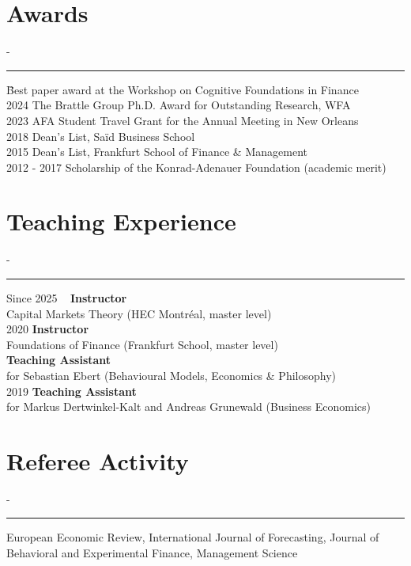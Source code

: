 \documentclass{res}
\newcommand{\sectionline}{	\vspace{-8pt}
	{\parindent-\sectionwidth \rule{\resumewidth}{0.4pt}} }
\newenvironment{nstabbing}
  {\setlength{\topsep}{-\parskip}%
   \setlength{\partopsep}{0pt}%
   \tabbing}
  {\endtabbing}
\begin{document}
\begin{resume}
\section{Awards} 	
	\sectionline
	\vspace{-3ex}
    \begin{nstabbing}
    2025 \qquad \qquad \qquad \= Best paper award at the Workshop on Cognitive Foundations in Finance \\[0.5ex]
    2024 \> The Brattle Group Ph.D. Award for Outstanding Research, WFA \\[0.5ex]
    2023 \> AFA Student Travel Grant for the Annual Meeting in New Orleans \\[0.5ex]
    2018 \> Dean's List, Sa\"{i}d Business School \\[0.5ex]
    2015 \> Dean's List, Frankfurt School of Finance \& Management \\[0.5ex]
    2012 - 2017 \> Scholarship of the Konrad-Adenauer Foundation (academic merit)
    \end{nstabbing}

\section{Teaching Experience}
	\sectionline
	\vspace{-3ex}
    \begin{nstabbing}
    Since 2025 ~ \qquad \quad \= \textbf{Instructor} \\
		\> Capital Markets Theory (HEC Montréal, master level)  \\[0.5ex]
    2020  \> \textbf{Instructor} \\
				\> Foundations of Finance (Frankfurt School, master level)  \\[0.5ex]
    \> \textbf{Teaching Assistant}\\
					\> for Sebastian Ebert (Behavioural Models, Economics \& Philosophy) \\[0.5ex]
    2019 \> \textbf{Teaching Assistant} \\
				\> for Markus Dertwinkel-Kalt and Andreas Grunewald (Business Economics)  \\[0.5ex]
    \end{nstabbing}

\section{Referee Activity}
\sectionline
\vspace{-3ex}
\begin{nstabbing} %
	\parbox[t]{\linewidth}{European Economic Review, International Journal of Forecasting, 
	Journal of Behavioral and Experimental Finance, Management Science}
\end{nstabbing}


\end{resume}
\end{document}
